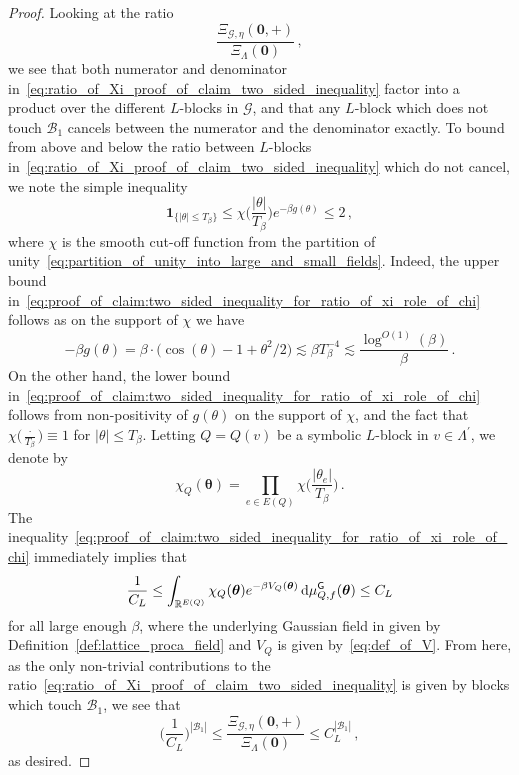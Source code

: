 \documentclass[11pt]{article}
\theoremstyle{definition}
\theoremstyle{remark}
\numberwithin{theorem}{section}
\def\La{{\Lambda}}
\newcommand{\bR}{\mathbb R}
\begin{document}
    \begin{proof}
        Looking at the ratio
        \begin{equation}
        \label{eq:ratio_of_Xi_proof_of_claim_two_sided_inequality}
        \frac{\Xi_{\mathcal{G},\eta}(\mathbf{0},+)}{\Xi_{\Lambda}(\mathbf{0})} \, ,    
        \end{equation}
        we see that both numerator and denominator in~\eqref{eq:ratio_of_Xi_proof_of_claim_two_sided_inequality} factor into a product over the different $L$-blocks in $\mathcal{G}$, and that any $L$-block which does not touch $\mathcal{B}_1$ cancels between the numerator and the denominator exactly. To bound from above and below the ratio between $L$-blocks in~\eqref{eq:ratio_of_Xi_proof_of_claim_two_sided_inequality} which do not cancel, we note the simple inequality 
        \begin{equation}\label{eq:proof_of_claim:two_sided_inequality_for_ratio_of_xi_role_of_chi}
            \mathbf{1}_{\{|\theta| \le T_\beta \}} \le \chi \Big(\frac{|\theta|}{T_\beta}\Big) e^{-\beta g(\theta)} \le 2 \, ,
        \end{equation}
        where $\chi$ is the smooth cut-off function from the partition of unity~\eqref{eq:partition_of_unity_into_large_and_small_fields}. Indeed, the upper bound in~\eqref{eq:proof_of_claim:two_sided_inequality_for_ratio_of_xi_role_of_chi} follows as on the support of $\chi$ we have
        \[
        -\beta g(\theta) = \beta \cdot \big( \cos(\theta) - 1 + \theta^2/2\big) \lesssim \beta T_\beta^{-4} \lesssim \frac{\log^{O(1)}(\beta)}{\beta} \, .
        \]
        On the other hand, the lower bound in~\eqref{eq:proof_of_claim:two_sided_inequality_for_ratio_of_xi_role_of_chi} follows from non-positivity of $g(\theta)$ on the support of $\chi$, and the fact that $\chi\big(\frac{\cdot}{T_\beta}\big)  \equiv 1$ for $|\theta| \le T_\beta$. 
        Letting $Q=Q(v)$ be a symbolic $L$-block in $v\in \La^\prime$, we denote by
        \begin{equation*}
        \chi_Q (\boldsymbol{\theta}) = \prod_{e\in E(Q)} \chi\Big(\frac{|\theta_e|}{T_\beta}\Big) \, .
        \end{equation*}
        The inequality~\eqref{eq:proof_of_claim:two_sided_inequality_for_ratio_of_xi_role_of_chi} immediately implies that 
        \begin{equation} \label{eq:two_sided_bound_for_corrector_in_given_L_block}
        \frac{1}{C_L} \le \int_{\bR^{E(Q)}} \chi_{Q}(\boldsymbol{\theta})  e^{-\beta V_{Q}(\boldsymbol{\theta})} \, {\rm d}\mu_{Q,f}^{\sf G}(\boldsymbol{\theta}) \le C_L    
        \end{equation}
        for all large enough $\beta$, where the underlying Gaussian field in given by Definition~\ref{def:lattice_proca_field} and $V_Q$ is given by~\eqref{eq:def_of_V}. From here, as the only non-trivial contributions to the ratio~\eqref{eq:ratio_of_Xi_proof_of_claim_two_sided_inequality} is given by blocks which touch $\mathcal{B}_1$, we see that 
        \[
        \Big(\frac{1}{C_L}\Big)^{|\mathcal{B}_1|} \le  \frac{\Xi_{\mathcal{G},\eta}(\mathbf{0},+)}{\Xi_{\Lambda}(\mathbf{0})} \le C_L^{|\mathcal{B}_1|} \, , 
        \]
        as desired.
    \end{proof}
\end{document}
